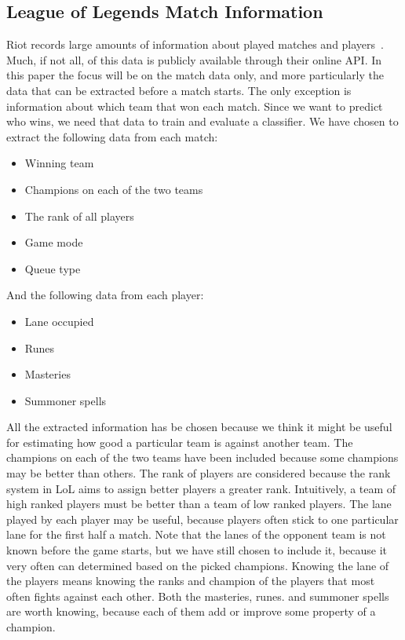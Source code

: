 \subsection{League of Legends Match Information}\label{sec:matchdata}
Riot records large amounts of information about played matches and players~\cite{matchinfo}. Much, if not all, of this data is publicly available through their online API. In this paper the focus will be on the match data only, and more particularly the data that can be extracted before a match starts. The only exception is information about which team that won each match. Since we want to predict who wins, we need that data to train and evaluate a classifier.
We have chosen to extract the following data from each match:
\begin{itemize}
\item Winning team
\item Champions on each of the two teams
\item The rank of all players
\item Game mode
\item Queue type
\end{itemize}
And the following data from each player:
\begin{itemize}
\item Lane occupied 
\item Runes 
\item Masteries 
\item Summoner spells 
\end{itemize}
All the extracted information has be chosen because we think it might be useful for estimating how good a particular team is against another team. 
The champions on each of the two teams have been included because some champions may be better than others.
The rank of players are considered because the rank system in LoL aims to assign better players a greater rank. Intuitively, a team of high ranked players must be better than a team of low ranked players.
The lane played by each player may be useful, because players often stick to one particular lane for the first half a match.
Note that the lanes of the opponent team is not known before the game starts, but we have still chosen to include it, because it very often can determined based on the picked champions. Knowing the lane of the players means knowing the ranks and champion of the players that most often fights against each other.
Both the masteries, runes. and summoner spells are worth knowing, because each of them add or improve some property of a champion. 
